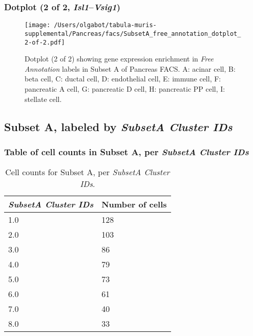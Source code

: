 \clearpage

\subsubsection{Dotplot (2 of 2, \emph{Isl1}--\emph{Vsig1})}
\begin{figure}[h]
\centering
\texttt{[image: /Users/olgabot/tabula-muris-supplemental/Pancreas/facs/SubsetA\_free\_annotation\_dotplot\_2-of-2.pdf]}

\caption{ Dotplot (2 of 2)  showing gene expression enrichment in \emph{Free Annotation} labels in Subset A of Pancreas FACS. A: acinar cell, B: beta cell, C: ductal cell, D: endothelial cell, E: immune cell, F: pancreatic A cell, G: pancreatic D cell, H: pancreatic PP cell, I: stellate cell.}
\end{figure}


\clearpage

\subsection{Subset A, labeled by \emph{SubsetA Cluster IDs}}
\subsubsection{Table of cell counts in Subset A, per \emph{SubsetA Cluster IDs}}\begin{table}[h]
\centering
\label{my-label}
\begin{tabular}{@{}ll@{}}
\toprule

\emph{SubsetA Cluster IDs}& Number of cells \\ \midrule
1.0 & 128 \\

2.0 & 103 \\

3.0 & 86 \\

4.0 & 79 \\

5.0 & 73 \\

6.0 & 61 \\

7.0 & 40 \\

8.0 & 33 \\
\bottomrule
\end{tabular}
\caption{Cell counts for Subset A, per \emph{SubsetA Cluster IDs}.}
\end{table}

